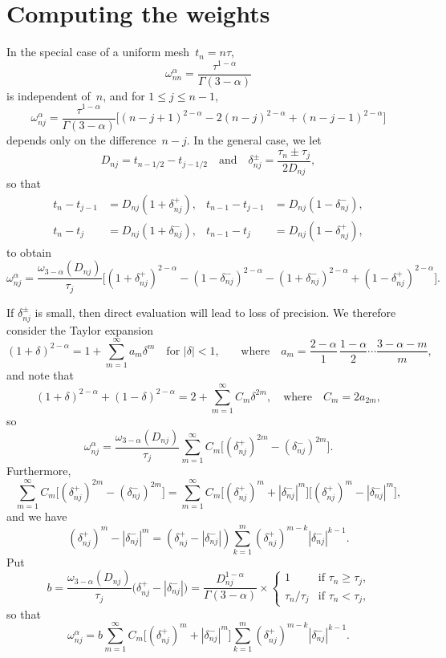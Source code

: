 \documentclass[a4paper,12pt]{article}
\begin{document}
\section{Computing the weights}

In the special case of a uniform mesh~$t_n=n\tau$,
\[
\omega^\alpha_{nn}=\frac{\tau^{1-\alpha}}{\Gamma(3-\alpha)}
\]
is independent of~$n$, and for $1\le j\le n-1$,
\[
\omega^\alpha_{nj}=\frac{\tau^{1-\alpha}}{\Gamma(3-\alpha)}\bigl[
    (n-j+1)^{2-\alpha}-2(n-j)^{2-\alpha}+(n-j-1)^{2-\alpha}\bigr]
\]
depends only on the difference~$n-j$.  In the general case, we let
\[
D_{nj}=t_{n-1/2}-t_{j-1/2}\quad\text{and}\quad
\delta_{nj}^\pm=\frac{\tau_n\pm\tau_j}{2D_{nj}},
\]
so that
\begin{align*}
t_n-t_{j-1}&=D_{nj}(1+\delta_{nj}^+),&
t_{n-1}-t_{j-1}&=D_{nj}(1-\delta_{nj}^-),\\
t_n-t_j&=D_{nj}(1+\delta_{nj}^-),&
t_{n-1}-t_j&=D_{nj}(1-\delta_{nj}^+),
\end{align*}
to obtain
\[
\omega^\alpha_{nj}=\frac{\omega_{3-\alpha}(D_{nj})}{\tau_j}\bigl[
 (1+\delta_{nj}^+)^{2-\alpha}-(1-\delta_{nj}^-)^{2-\alpha}
-(1+\delta_{nj}^-)^{2-\alpha}+(1-\delta_{nj}^+)^{2-\alpha}\bigr].
\]

If $\delta_{nj}^\pm$ is small, then direct evaluation will lead to loss of
precision.  We therefore consider the Taylor expansion
\[
(1+\delta)^{2-\alpha}=1+\sum_{m=1}^\infty a_m\delta^m
\quad\text{for $|\delta|<1$,}\quad
\quad\text{where}\quad
a_m=\frac{2-\alpha}{1}\,\frac{1-\alpha}{2}\cdots\frac{3-\alpha-m}{m},
\]
and note that
\[
(1+\delta)^{2-\alpha}+(1-\delta)^{2-\alpha}
    =2+\sum_{m=1}^\infty C_m\delta^{2m},
\quad\text{where}\quad C_m=2a_{2m},
\]
so
\begin{equation}\label{eq: omega series}
\omega^\alpha_{nj}=\frac{\omega_{3-\alpha}(D_{nj})}{\tau_j}\sum_{m=1}^\infty
    C_m\bigl[(\delta_{nj}^+)^{2m}-(\delta_{nj}^-)^{2m}\bigr].
\end{equation}
Furthermore,
\[
\sum_{m=1}^\infty C_m\bigl[(\delta_{nj}^+)^{2m}-(\delta_{nj}^-)^{2m}\bigr]
    =\sum_{m=1}^\infty C_m
    \bigl[(\delta_{nj}^+)^m+|\delta_{nj}^-|^m\bigr]
    \bigl[(\delta_{nj}^+)^m-|\delta_{nj}^-|^m\bigr],
\]
and we have
\[
(\delta_{nj}^+)^m-|\delta_{nj}^-|^m=(\delta_{nj}^+-|\delta_{nj}^-|)
    \sum_{k=1}^m(\delta_{nj}^+)^{m-k}|\delta_{nj}^-|^{k-1}.
\]
Put
\[
b=\frac{\omega_{3-\alpha}(D_{nj})}{\tau_j}\bigl(
    \delta_{nj}^+-|\delta_{nj}^-|\bigr)
    =\frac{D_{nj}^{1-\alpha}}{\Gamma(3-\alpha)}\times\begin{cases}
1&\text{if $\tau_n\ge\tau_j$,}\\
\tau_n/\tau_j&\text{if $\tau_n<\tau_j$,}
\end{cases}
\]
so that
\begin{equation}\label{eq: omega sum}
\omega^\alpha_{nj}=b\sum_{m=1}^\infty C_m
    \bigl[(\delta_{nj}^+)^m+|\delta_{nj}^-|^m\bigr]
    \sum_{k=1}^m(\delta_{nj}^+)^{m-k}|\delta_{nj}^-|^{k-1}.
\end{equation}
\end{document}
